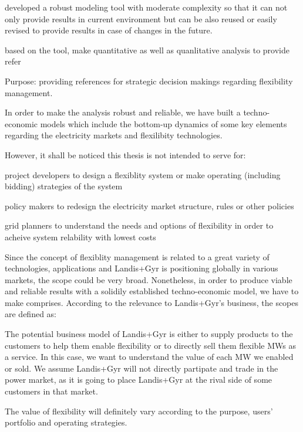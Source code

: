 developed a robust modeling tool with moderate complexity so that it can not only provide results in current environment but can be also reused or easily revised to provide results in case of changes in the future.

based on the tool, make quantitative as well as quanlitative analysis to provide refer 

Purpose: providing references for strategic decision makings regarding flexibility management.

In order to make the analysis robust and reliable, we have built a techno-economic models which include the bottom-up dynamics of some key elements regarding the electricity markets and flexilibity technologies. 

However, it shall be noticed this thesis is not intended to serve for:

project developers to design a flexiblity system or make operating (including bidding) strategies of the system

policy makers to redesign the electricity market structure, rules or other policies

grid planners to understand the needs and options of flexibility in order to acheive system relability with lowest costs


Since the concept of flexiblity management is related to a great variety of technologies, applications and Landis+Gyr is positioning globally in various markets, the scope could be very broad. Nonetheless, in order to produce viable and reliable results with a solidily established techno-economic model, we have to make comprises. According to the relevance to Landis+Gyr's business, the scopes are defined as:



The potential business model of Landis+Gyr is either to supply products to the customers to help them enable flexibility or to directly sell them flexible MWs as a service. In this case, we want to understand the value of each MW we enabled or sold. We assume Landis+Gyr will not directly partipate and trade in the power market, as it is going to place Landis+Gyr at the rival side of some customers in that market.

The value of flexibility will definitely vary according to the purpose, users' portfolio and operating strategies. 


